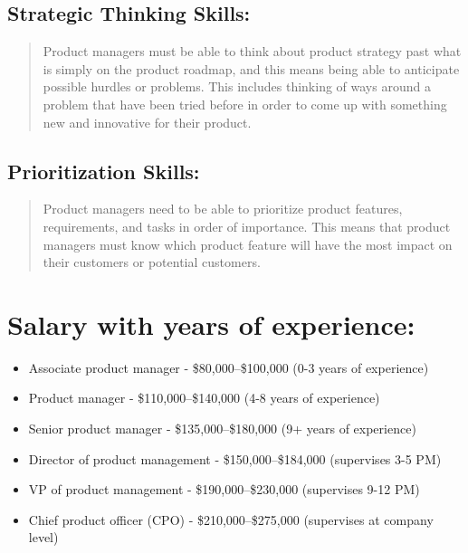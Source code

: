 \documentclass[
]{book}
\providecommand{\tightlist}{%
  \setlength{\itemsep}{0pt}\setlength{\parskip}{0pt}}
\begin{document}
\hypertarget{strategic-thinking-skills}{%
\subsection*{Strategic Thinking Skills:}\label{strategic-thinking-skills}}

\begin{quote}
Product managers must be able to think about product strategy past what is simply on the product roadmap, and this means being able to anticipate possible hurdles or problems. This includes thinking of ways around a problem that have been tried before in order to come up with something new and innovative for their product.
\end{quote}

\hypertarget{prioritization-skills}{%
\subsection*{Prioritization Skills:}\label{prioritization-skills}}

\begin{quote}
Product managers need to be able to prioritize product features, requirements, and tasks in order of importance. This means that product managers must know which product feature will have the most impact on their customers or potential customers.
\end{quote}

\hypertarget{salary-with-years-of-experience-1}{%
\section*{Salary with years of experience:}\label{salary-with-years-of-experience-1}}

\begin{itemize}
\tightlist
\item
  Associate product manager - \$80,000--\$100,000 (0-3 years of experience)\\
\item
  Product manager - \$110,000--\$140,000 (4-8 years of experience)\\
\item
  Senior product manager - \$135,000--\$180,000 (9+ years of experience)\\
\item
  Director of product management - \$150,000--\$184,000 (supervises 3-5 PM)\\
\item
  VP of product management - \$190,000--\$230,000 (supervises 9-12 PM)\\
\item
  Chief product officer (CPO) - \$210,000--\$275,000 (supervises at company level)
\end{itemize}
\end{document}
